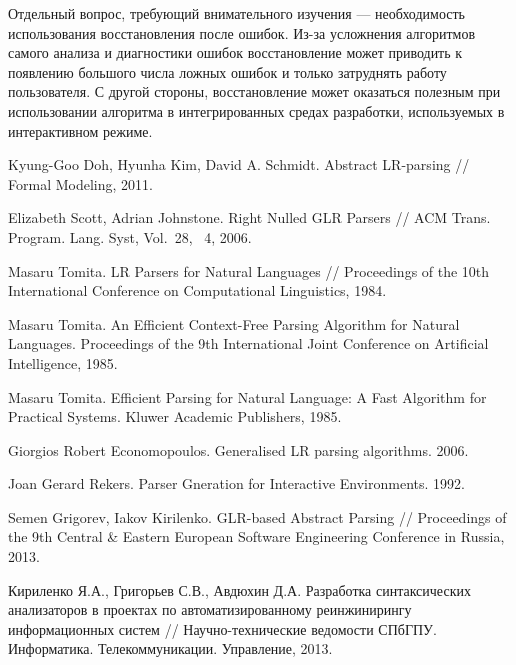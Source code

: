 Отдельный вопрос, требующий внимательного изучения — необходимость использования 
восстановления после ошибок. Из-за усложнения алгоритмов самого анализа и диагностики 
ошибок восстановление может приводить к появлению большого числа ложных ошибок и 
только затруднять работу пользователя. С другой стороны, восстановление может 
оказаться полезным при использовании алгоритма в интегрированных средах разработки, 
используемых в интерактивном режиме.

\begin{thebibliography}{99}
 Kyung-Goo Doh, Hyunha Kim, David A. Schmidt.
 Abstract LR-parsing // Formal Modeling, 2011.

 Elizabeth Scott, Adrian Johnstone.
 Right Nulled GLR Parsers //
 ACM Trans. Program. Lang. Syst, Vol.~28, \No~4, 2006.

 Masaru Tomita.
 LR Parsers for Natural Languages //
 Proceedings of the 10th International Conference on Computational Linguistics, 1984.

 Masaru Tomita.
 An Efficient Context-Free Parsing Algorithm for Natural Languages.
 Proceedings of the 9th International Joint Conference on Artificial Intelligence, 1985.

 Masaru Tomita.
 Efficient Parsing for Natural Language: A Fast Algorithm for Practical Systems. 
 Kluwer Academic Publishers, 1985.

  Giorgios Robert Economopoulos. 
  Generalised LR parsing algorithms. 2006.

  Joan Gerard Rekers.
  Parser Gneration for Interactive Environments. 1992.

  Semen Grigorev, Iakov Kirilenko.
  GLR-based Abstract Parsing // 
  Proceedings of the 9th Central \& Eastern European Software Engineering Conference in Russia, 2013.

 Кириленко Я.А., Григорьев С.В., Авдюхин Д.А.
 Разработка синтаксических анализаторов в проектах по автоматизированному реинжинирингу информационных систем //
 Научно-технические ведомости СПбГПУ. Информатика. Телекоммуникации. Управление, 2013.
\end{thebibliography}
